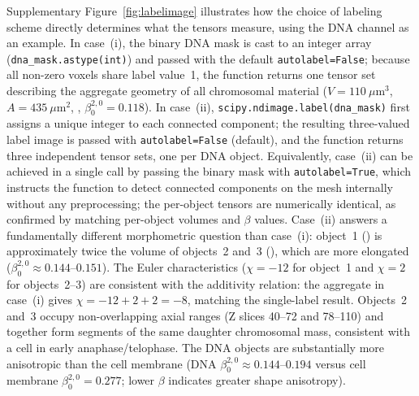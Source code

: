 \documentclass[times, twoside, watermark]{zHenriquesLab-StyleBioRxiv}
\newcommand{\newtxt}[1]{\textcolor{chgadded}{#1}}
\renewcommand{\added}[2][]{\newtxt{#2}}
\begin{document}
Supplementary Figure~\ref{fig:labelimage} illustrates how the choice of labeling scheme directly determines what the tensors measure, using the DNA channel as an example.
In case~(i), the binary DNA mask is cast to an integer array (\texttt{dna\_mask.astype(int)}) and passed with the default \texttt{autolabel=False}; because all non-zero voxels share label value~1, the function returns one tensor set describing the aggregate geometry of all chromosomal material ($V = 110~\mu\text{m}^3$, $A = 435~\mu\text{m}^2$, , $\beta_0^{2,0} = 0.118$).
In case~(ii), \texttt{scipy.ndimage.label(dna\_mask)} first assigns a unique integer to each connected component; the resulting three-valued label image is passed with \texttt{autolabel=False} (default), and the function returns three independent tensor sets, one per DNA object.
Equivalently, case~(ii) can be achieved in a single call by passing the binary mask with \texttt{autolabel=True}, which instructs the function to detect connected components on the mesh internally without any preprocessing; the per-object tensors are numerically identical, as confirmed by matching per-object volumes and $\beta$ values.
Case~(ii) answers a fundamentally different morphometric question than case~(i): object~1 () is approximately twice the volume of objects~2 and~3 (), which are more elongated ($\beta_0^{2,0} \approx 0.144$--$0.151$).
\added{The Euler characteristics ($\chi = -12$ for object~1 and $\chi = 2$ for objects~2--3) are consistent with the additivity relation: the aggregate in case~(i) gives $\chi = -12 + 2 + 2 = -8$, matching the single-label result.}
Objects~2 and~3 occupy non-overlapping axial ranges (Z slices 40--72 and 78--110) and together form segments of the same daughter chromosomal mass, consistent with a cell in early anaphase/telophase.
The DNA objects are substantially more anisotropic than the cell membrane (DNA $\beta_0^{2,0} \approx 0.144$--$0.194$ versus cell membrane $\beta_0^{2,0} = 0.277$; lower $\beta$ indicates greater shape anisotropy).
\end{document}
